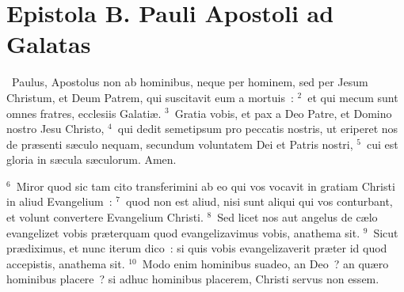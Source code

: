 \clearpage
{\centering \section*{Epistola B. Pauli Apostoli ad Galatas}}\thispagestyle{empty}

~Paulus, Apostolus non ab hominibus, neque per hominem, sed per Jesum Christum, et Deum Patrem, qui suscitavit eum a mortuis~:
${}^{2}$~et qui mecum sunt omnes fratres, ecclesiis Galati\ae .
${}^{3}$~Gratia vobis, et pax a Deo Patre, et Domino nostro Jesu Christo,
${}^{4}$~qui dedit semetipsum pro peccatis nostris, ut eriperet nos de pr\ae senti s\ae culo nequam, secundum voluntatem Dei et Patris nostri,
${}^{5}$~cui est gloria in s\ae cula s\ae culorum. Amen.


${}^{6}$~Miror quod sic tam cito transferimini ab eo qui vos vocavit in gratiam Christi in aliud Evangelium~:
${}^{7}$~quod non est aliud, nisi sunt aliqui qui vos conturbant, et volunt convertere Evangelium Christi.
${}^{8}$~Sed licet nos aut angelus de c\ae lo evangelizet vobis pr\ae terquam quod evangelizavimus vobis, anathema sit.
${}^{9}$~Sicut pr\ae diximus, et nunc iterum dico~: si quis vobis evangelizaverit pr\ae ter id quod accepistis, anathema sit.
${}^{10}$~Modo enim hominibus suadeo, an Deo~? an qu\ae ro hominibus placere~? si adhuc hominibus placerem, Christi servus non essem.


